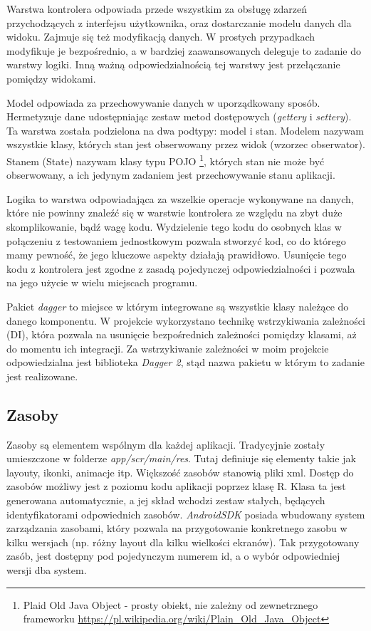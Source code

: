 \documentclass[openright]{xmgr}
\begin{document}
Warstwa kontrolera odpowiada przede wszystkim za obsługę zdarzeń przychodzących z interfejsu użytkownika, oraz dostarczanie modelu danych dla widoku. Zajmuje się też modyfikacją danych. W prostych przypadkach modyfikuje je bezpośrednio, a w bardziej zaawansowanych deleguje to zadanie do warstwy logiki. Inną ważną odpowiedzialnością tej warstwy jest przełączanie pomiędzy widokami. 

Model odpowiada za przechowywanie danych w uporządkowany sposób. Hermetyzuje dane udostępniając zestaw metod dostępowych (\textit{gettery} i \textit{settery}). Ta warstwa została podzielona na dwa podtypy: model i stan. Modelem nazywam wszystkie klasy, których stan jest obserwowany przez widok (wzorzec obserwator). Stanem (State) nazywam klasy typu POJO \footnote{Plaid Old Java Object - prosty obiekt, nie zależny od zewnetrznego frameworku \url{https://pl.wikipedia.org/wiki/Plain_Old_Java_Object}}, których stan nie może być obserwowany, a ich jedynym zadaniem jest przechowywanie stanu aplikacji. 

Logika to warstwa odpowiadająca za wszelkie operacje wykonywane na danych, które nie powinny znaleźć się w warstwie kontrolera ze względu na zbyt duże skomplikowanie, bądź wagę kodu. Wydzielenie tego kodu do osobnych klas w połączeniu z testowaniem jednostkowym pozwala stworzyć kod, co do którego mamy pewność, że jego kluczowe aspekty działają prawidłowo. Usunięcie tego kodu z kontrolera jest zgodne z zasadą pojedynczej odpowiedzialności \cite{CleanCode:2005} i pozwala na jego użycie w wielu miejscach programu. 

Pakiet \textit{dagger} to miejsce w którym integrowane są wszystkie klasy należące do danego komponentu. W projekcie wykorzystano technikę wstrzykiwania zależności (DI), która pozwala na usunięcie bezpośrednich zależności pomiędzy klasami, aż do momentu ich integracji. Za wstrzykiwanie zależności w moim projekcie odpowiedzialna jest biblioteka \textit{Dagger 2}, stąd nazwa pakietu w którym to zadanie jest realizowane.

\subsection*{Zasoby}
Zasoby są elementem wspólnym dla każdej aplikacji. Tradycyjnie zostały umieszczone w folderze \textit{app/scr/main/res}. Tutaj definiuje się elementy takie jak layouty, ikonki, animacje itp. Większość zasobów stanowią pliki xml. Dostęp do zasobów możliwy jest z poziomu kodu aplikacji poprzez klasę R. Klasa ta jest generowana automatycznie, a jej skład wchodzi zestaw stałych, będących identyfikatorami odpowiednich zasobów. \textit{AndroidSDK} posiada wbudowany system zarządzania zasobami, który pozwala na przygotowanie konkretnego zasobu w kilku wersjach (np. różny layout dla kilku wielkości ekranów). Tak przygotowany zasób, jest dostępny pod pojedynczym numerem id, a o wybór odpowiedniej wersji dba system.
\end{document}
